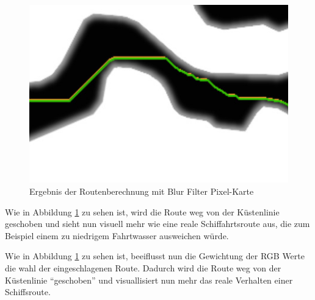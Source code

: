 \documentclass[letterpaper]{article}
\begin{document}

		\begin{figure}[!htbp]
			\centering
			\includegraphics[width=\linewidth]{route_after_blur}
			\caption{Ergebnis der Routenberechnung mit Blur Filter Pixel-Karte}
			\label{fig:route_after_blur}
		\end{figure}

		Wie in Abbildung \ref{fig:route_after_blur} zu sehen ist, wird die Route weg von der Küstenlinie geschoben und sieht nun visuell mehr wie eine reale Schiffahrtsroute aus, die zum Beispiel einem zu niedrigem Fahrtwasser ausweichen würde.

		Wie in Abbildung \ref{fig:route_after_blur} zu sehen ist, beeiflusst nun die Gewichtung der RGB Werte die wahl der eingeschlagenen Route. Dadurch wird die Route weg von der Küstenlinie "`geschoben"' und visuallisiert nun mehr das reale Verhalten einer Schiffsroute.


{\footnotesize 
}
\end{document}
